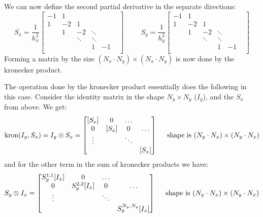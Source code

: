 \documentclass[10pt]{report}
\begin{document}
We can now define the second partial derivative in the separate directions:
\begin{equation*}
    S_x = \frac{1}{h_x^2}\begin{bmatrix}
        -1&1&\\
        1&-2&1&\\
        &1&-2&\ddots\\
        &&\ddots&\ddots&&
        \\
        &&&1&-1\\
    \end{bmatrix}\hspace{1cm}S_y = \frac{1}{h_y^2}\begin{bmatrix}
        -1&1&\\
        1&-2&1&\\
        &1&-2&\ddots\\
        &&\ddots&\ddots&&
        \\
        &&&1&-1\\
    \end{bmatrix}
\end{equation*}
Forming a matrix by the size $(N_x \cdot N_y) \times (N_x \cdot N_y)$ is now done by the kronecker product.

The operation done by the kronecker product essentially does the following in this case. Consider the identity matrix in the shape $N_y\times N_y$ ($I_y$), and the $S_x$ from above. We get:
\begin{equation*}
    \text{kron}(I_y, S_x) =  I_y \otimes S_x = \begin{bmatrix}
        [S_x] & 0 & \hdots\\
        0&[S_x]&0 &\hdots\\
        \vdots& &\ddots\\
        &&&[S_x]
    \end{bmatrix} \hspace{5 mm} \text{shape is $(N_y\cdot N_x) \times (N_y\cdot N_x)$} 
\end{equation*} 
and for the other term in the sum of kronecker products we have:
\begin{equation*}
    S_y \otimes I_x = \begin{bmatrix}
        S_y^{1,1} [I_x] & 0 & \hdots\\
        0&S_y^{2,2}[I_x]& 0 &\hdots\\
        \vdots& &\ddots\\
        &&&S_y^{N_y,N_y}[I_x]
        \end{bmatrix}\hspace{5 mm} \text{shape is $(N_y\cdot N_x) \times (N_y\cdot N_x)$} 
\end{equation*}
\end{document}
